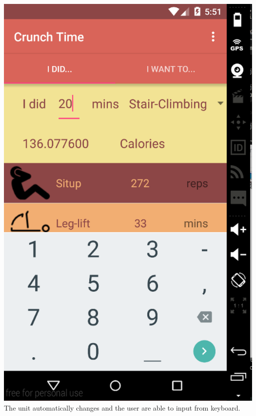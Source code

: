 \documentclass[11pt]{article}
\begin{document}
\includegraphics[scale=0.3]{shot3.png}\\
The unit automatically changes and the user are able to input from keyboard.\\
\end{document}
